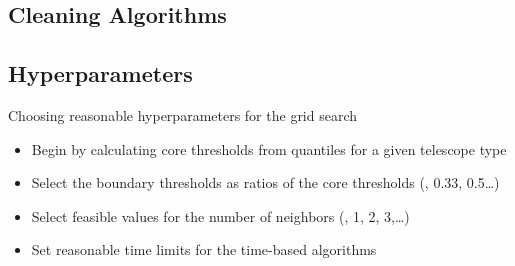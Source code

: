 \subsection{Cleaning Algorithms}%
\label{sub:Cleaning_algorithms}

    {%
    
    }
    {%
    
    }

\subsection{Hyperparameters}%
\label{sub:Hyperparameters}
\begin{frame}{Choosing reasonable hyperparameters for the grid search}
    \begin{overlayarea}{\textwidth}{2.5cm}
        \begin{itemize}
            \item<1-> Begin by calculating core thresholds from quantiles for a given telescope type
            \item<3-> Select the boundary thresholds as ratios of the core thresholds (, 0.33, 0.5\dots)
            \item<4-> Select feasible values for the number of neighbors (, 1, 2, 3,\dots)
            \item<5-> Set reasonable time limits for the time-based algorithms
        \end{itemize}
    \end{overlayarea}
    \begin{overlayarea}{\textwidth}{\textheight}
    \end{overlayarea}
\end{frame}